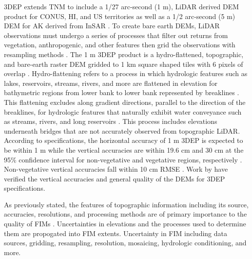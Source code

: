 \documentclass[water,article,submit,pdftex,moreauthors]{dependencies/Definitions/mdpi}
\begin{document}
\ac{3DEP} extends \ac{TNM} to include a 1/27 arc-second (1 \ac{m}), \ac{LiDAR} derived \ac{DEM} product for \ac{CONUS}, \ac{HI}, and \ac{US} territories as well as a 1/2 arc-second (5 \ac{m}) \ac{DEM} for \ac{AK} derived from \ac{InSAR} \cite{sugarbaker20143d,stoker2015usgs}.
To create bare earth \acp{DEM}, \ac{LiDAR} observations must undergo a series of processes that filter out returns from vegetation, anthropogenic, and other features then grid the observations with resampling methods \cite{passalacqua2015analyzing}.
The 1 \ac{m} \ac{3DEP} product is a \ac{hydro-flattened}, topographic, and bare-earth raster \ac{DEM} gridded to 1 \ac{km} square shaped tiles with 6 pixels of overlap \cite{arundel20151}.
Hydro-flattening refers to a process in which hydrologic features such as lakes, reservoirs, streams, rivers, and more are flattened in elevation for bathymetric regions from lower bank to lower bank represented by breaklines \cite{archuleta2017national,maune2018digital}.
This flattening excludes along gradient directions, parallel to the direction of the breaklines, for hydrologic features that naturally exhibit water conveyance such as streams, rivers, and long reservoirs \cite{arundel20151}.
This process includes elevations underneath bridges that are not accurately observed from topographic \ac{LiDAR}.
According to specifications, the horizontal accuracy of 1 \ac{m} \ac{3DEP} is expected to be within 1 \ac{m} while the vertical accuracies are within 19.6 \ac{cm} and 30 \ac{cm} at the 95\% confidence interval for non-vegetative and vegetative regions, respectively \cite{arundel20151,heidemann2018lidar}.
Non-vegetative vertical accuracies fall within 10 \ac{cm} \ac{RMSE} \cite{arundel20151,heidemann2018lidar}.
 Work by \citet{stoker2022accuracy,callahan2022vertical,kim2022absolute} have verified the vertical accuracies and general quality of the \acp{DEM} for \ac{3DEP} specifications.

As previously stated, the features of topographic information including its source, accuracies, resolutions, and processing methods are of primary importance to the quality of \acp{FIM} \cite{national2007elevation,national2009mapping,carswell20183d,bales2009sources}.
Uncertainties in elevations and the processes used to determine them are propogated into \ac{FIM} extents.
Uncertainty in FIM \cite{merwade2008uncertainty} including data sources, gridding, resampling, resolution, mosaicing, hydrologic conditioning, and more. 
\end{document}
